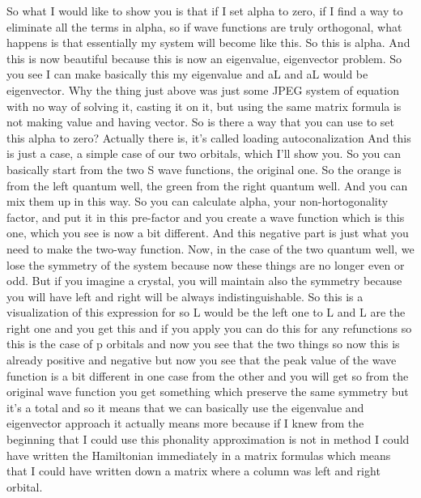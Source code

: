 So what I would like to show you is that if I set alpha to zero, if I find a way to eliminate all the terms in alpha, so if wave functions are truly orthogonal, what happens is that essentially my system will become like this. So this is alpha. And this is now beautiful because this is now an eigenvalue, eigenvector problem. So you see I can make basically this my eigenvalue and aL and aL would be eigenvector. Why the thing just above was just some JPEG system of equation with no way of solving it, casting it on it, but using the same matrix formula is not making value and having vector. So is there a way that you can use to set this alpha to zero? Actually there is, it's called loading autoconalization And this is just a case, a simple case of our two orbitals, which I'll show you. So you can basically start from the two S wave functions, the original one. So the orange is from the left quantum well, the green from the right quantum well. And you can mix them up in this way. So you can calculate alpha, your non-hortogonality factor, and put it in this pre-factor and you create a wave function which is this one, which you see is now a bit different. And this negative part is just what you need to make the two-way function. Now, in the case of the two quantum well, we lose the symmetry of the system because now these things are no longer even or odd. But if you imagine a crystal, you will maintain also the symmetry because you will have left and right will be always indistinguishable. So this is a visualization of this expression for so L would be the left one to L and L are the right one and you get this and if you apply you can do this for any refunctions so this is the case of p orbitals and now you see that the two things so now this is already positive and negative but now you see that the peak value of the wave function is a bit different in one case from the other and you will get so from the original wave function you get something which preserve the same symmetry but it's a total and so it means that we can basically use the eigenvalue and eigenvector approach it actually means more because if I knew from the beginning that I could use this phonality approximation is not in method I could have written the Hamiltonian immediately in a matrix formulas which means that I could have written down a matrix where a column was left and right orbital.\\
